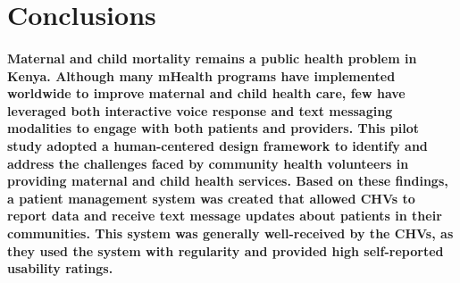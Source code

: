 \section{Conclusions}
\paragraph{Maternal and child mortality remains a public health problem in Kenya. Although many mHealth programs have implemented worldwide to improve maternal and child health care, few have leveraged both interactive voice response and text messaging modalities to engage with both patients and providers. This pilot study adopted a human-centered design framework to identify and address the challenges faced by community health volunteers in providing maternal and child health services. Based on these findings, a patient management system was created that allowed CHVs to report data and receive text message updates about patients in their communities. This system was generally well-received by the CHVs, as they used the system with regularity and provided high self-reported usability ratings.}
